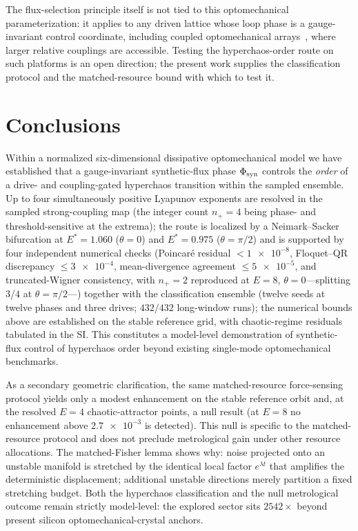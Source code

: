 \documentclass[preprint,numbers,a4paper]{elsarticle}
\begin{document}
The flux-selection principle itself is not tied to this optomechanical parameterization: it applies to any driven lattice whose loop phase is a gauge-invariant control coordinate, including coupled optomechanical arrays~\cite{peano2015,sanavio2020}, where larger relative couplings are accessible. Testing the hyperchaos-order route on such platforms is an open direction; the present work supplies the classification protocol and the matched-resource bound with which to test it.

\section{Conclusions}

Within a normalized six-dimensional dissipative optomechanical model we have established that a gauge-invariant synthetic-flux phase $\Phi_{\rm syn}$ controls the \emph{order} of a drive- and coupling-gated hyperchaos transition within the sampled ensemble. Up to four simultaneously positive Lyapunov exponents are resolved in the sampled strong-coupling map (the integer count $n_+=4$ being phase- and threshold-sensitive at the extrema); the route is localized by a Neimark--Sacker bifurcation at $E^{*}=\num{1.060}$ ($\theta=0$) and $E^{*}=\num{0.975}$ ($\theta=\pi/2$) and is supported by four independent numerical checks (Poincar\'e residual $<\num{1e-8}$, Floquet--QR discrepancy $\le\num{3e-4}$, mean-divergence agreement $\le\num{5e-5}$, and truncated-Wigner consistency, with $n_+=2$ reproduced at $E=\num{8}$, $\theta=\num{0}$---splitting $3$/$4$ at $\theta=\pi/2$---) together with the classification ensemble (twelve seeds at twelve phases and three drives; $\num{432}/\num{432}$ long-window runs); the numerical bounds above are established on the stable reference grid, with chaotic-regime residuals tabulated in the SI. This constitutes a model-level demonstration of synthetic-flux control of hyperchaos order beyond existing single-mode optomechanical benchmarks.

As a secondary geometric clarification, the same matched-resource force-sensing protocol yields only a modest enhancement on the stable reference orbit and, at the resolved $E=\num{4}$ chaotic-attractor points, a null result (at $E=\num{8}$ no enhancement above $\num{2.7e-3}$ is detected). This null is specific to the matched-resource protocol and does not preclude metrological gain under other resource allocations. The matched-Fisher lemma shows why: noise projected onto an unstable manifold is stretched by the identical local factor $e^{\lambda t}$ that amplifies the deterministic displacement; additional unstable directions merely partition a fixed stretching budget. Both the hyperchaos classification and the null metrological outcome remain strictly model-level: the explored sector sits $\num{2542}\times$ beyond present silicon optomechanical-crystal anchors.
\end{document}
